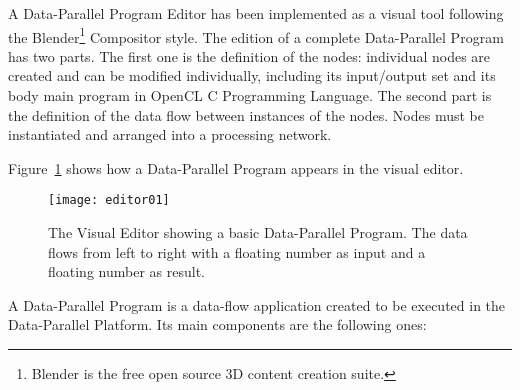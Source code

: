 \documentclass[conference]{IEEEtran}
\newcommand{\is}{250pt} \newcommand{\iss}{250pt}
\begin{document}
A Data-Parallel Program Editor has been implemented as a visual tool following
the Blender\footnote{Blender is the free open source 3D content creation suite.}
Compositor style.  The edition of a complete Data-Parallel Program has two
parts.  The first one is the definition of the nodes: individual nodes are
created and can be modified individually, including its input/output set and its
body main program in OpenCL C Programming Language.  The second part is the
definition of the data flow between instances of the nodes. Nodes must be
instantiated and arranged into a processing network.

Figure~\ref{fig:program01} shows how a Data-Parallel Program appears in the
visual editor.

\begin{figure}[t]
\begin{center}
\texttt{[image: editor01]}
\end{center}
\caption{The Visual Editor showing a basic Data-Parallel Program. The data flows
  from left to right with a floating number as input and a floating number as
  result.}
\label{fig:program01}
\end{figure}




A Data-Parallel Program is a data-flow application created to be executed in the
Data-Parallel Platform. Its main components are the following ones:
\end{document}
